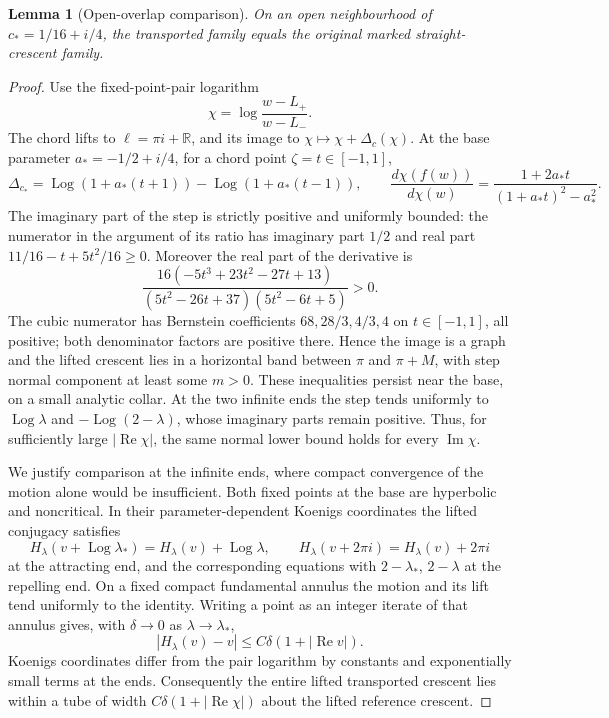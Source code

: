 \documentclass[11pt]{article}
\newtheorem{lemma}[theorem]{Lemma}
\newcommand{\re}{\operatorname{Re}}
\newcommand{\im}{\operatorname{Im}}
\newcommand{\Log}{\operatorname{Log}}
\begin{document}
\begin{lemma}[Open-overlap comparison]\label{lem:transport-compare}
On an open neighbourhood of $c_*=1/16+i/4$, the transported family
equals the original marked straight-crescent family.
\end{lemma}
\begin{proof}
Use the fixed-point-pair logarithm
\[
 \chi=\log\frac{w-L_+}{w-L_-}.
\]
The chord lifts to $\ell=\pi i+\mathbb R$, and its image to
$\chi\mapsto\chi+\Delta_c(\chi)$. At the base parameter
$a_*=-1/2+i/4$, for a chord point $\zeta=t\in[-1,1]$,
\[
 \Delta_{c_*}=\Log(1+a_*(t+1))-\Log(1+a_*(t-1)),\qquad
 \frac{d\chi(f(w))}{d\chi(w)}
 =\frac{1+2a_*t}{(1+a_*t)^2-a_*^2}.
\]
The imaginary part of the step is strictly positive and uniformly
bounded: the numerator in the argument of its ratio has imaginary
part $1/2$ and real part $11/16-t+5t^2/16\ge0$.
Moreover the real part of the derivative is
\[
 \frac{16(-5t^3+23t^2-27t+13)}
 {(5t^2-26t+37)(5t^2-6t+5)}>0.
\]
The cubic numerator has Bernstein coefficients
$68,28/3,4/3,4$ on $t\in[-1,1]$, all positive; both denominator
factors are positive there. Hence the image is a graph and the lifted
crescent lies in a horizontal band between $\pi$ and $\pi+M$, with
step normal component at least some $m>0$. These inequalities persist
near the base, on a small analytic collar. At the two infinite ends
the step tends uniformly to $\Log\lambda$ and $-\Log(2-\lambda)$,
whose imaginary parts remain positive. Thus, for sufficiently large
$|\re\chi|$, the same normal lower bound holds for every $\im\chi$.

We justify comparison at the infinite ends, where compact convergence
of the motion alone would be insufficient. Both fixed points at the
base are hyperbolic and noncritical. In their parameter-dependent
Koenigs coordinates the lifted conjugacy satisfies
\[
 H_\lambda(v+\Log\lambda_*)=H_\lambda(v)+\Log\lambda,
 \qquad H_\lambda(v+2\pi i)=H_\lambda(v)+2\pi i
\]
at the attracting end, and the corresponding equations with
$2-\lambda_*$, $2-\lambda$ at the repelling end.
On a fixed compact fundamental annulus the motion and its lift tend
uniformly to the identity. Writing a point as an integer iterate of
that annulus gives, with $\delta\to0$ as $\lambda\to\lambda_*$,
\[
 |H_\lambda(v)-v|\le C\delta(1+|\re v|).
\]
Koenigs coordinates differ from the pair logarithm by constants and
exponentially small terms at the ends. Consequently the entire lifted
transported crescent lies within a tube of width
$C\delta(1+|\re\chi|)$ about the lifted reference crescent.


\end{proof}
\end{document}
